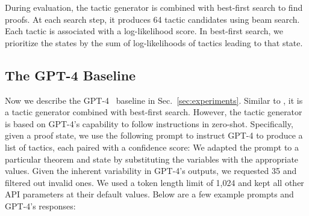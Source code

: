 During evaluation, the tactic generator is combined with best-first search to find proofs. At each search step, it produces 64 tactic candidates using beam search. Each tactic is associated with a log-likelihood score. In best-first search, we prioritize the states by the sum of log-likelihoods of tactics leading to that state. 


\subsection{The GPT-4 Baseline}
\label{appendix:gpt-4}

Now we describe the GPT-4~\cite{openai2023gpt4} baseline in Sec.~\ref{sec:experiments}. Similar to {\name}, it is a tactic generator combined with best-first search. However, the tactic generator is based on GPT-4's capability to follow instructions in zero-shot. Specifically, given a proof state, we use the following prompt to instruct GPT-4 to produce a list of tactics, each paired with a confidence score:
{
\setlength{\fboxsep}{0.8em}
\noindent{}
}
We adapted the prompt to a particular theorem and state by substituting the variables with the appropriate values. Given the inherent variability in GPT-4's outputs, we requested 35 and filtered out invalid ones. We used a token length limit of 1,024 and kept all other API parameters at their default values. Below are a few example prompts and GPT-4's responses:

